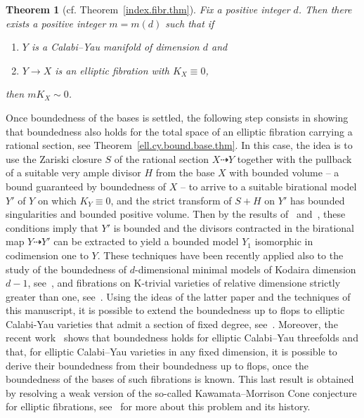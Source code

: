 \documentclass[11pt]{ip-journal}
\newtheorem{theorem}{Theorem}[section]
\theoremstyle{definition}
\begin{document}
\begin{theorem}[cf. Theorem~\ref{index.fibr.thm}]
Fix a positive integer $d$.
Then there exists a positive integer $m = m(d)$ such that if
\begin{enumerate}
    \item $Y$ is a Calabi--Yau manifold of dimension $d$ and
    \item $Y \to X$ is an elliptic fibration with $K_X \equiv 0$,
\end{enumerate}
then $m K_X \sim 0$.
\end{theorem}

Once boundedness of the bases is settled, the following step consists in showing that boundedness also holds for the total space of an elliptic fibration carrying a rational section, see 
Theorem~\ref{ell.cy.bound.base.thm}.
In this case, the idea is to use the Zariski closure $S$ of the rational section $X \dashrightarrow Y$ together with the pullback of a suitable very ample divisor $H$ from the base $X$ with bounded volume -- a bound guaranteed by boundedness of $X$ -- to arrive to a suitable birational model $Y'$ of $Y$ on which $K_Y \equiv 0$, and the strict transform of $S+H$ on $Y'$ has bounded singularities and bounded positive volume.
Then by the results of~\cite{MR3224718} and~\cite{1811.10709}, these conditions imply that 
$Y'$ 
is bounded and the divisors contracted in the birational map 
$Y \dashrightarrow Y'$ 
can be extracted to yield a bounded model 
$Y_1$ 
isomorphic in codimension one to 
$Y$.
These techniques have been recently applied also to the study of the boundedness of 
$d$-dimensional 
minimal models of Kodaira dimension 
$d-1$, 
see~\cites{2005.04254, 2005.05508}, and fibrations on K-trivial varieties of relative dimensione strictly greater than one, see~\cites{2202.07238, 2204.10456}.
Using the ideas of the latter paper and the techniques of this manuscript, it is possible to extend the boundedness up to flops to elliptic Calabi-Yau varieties that admit a section of fixed degree, see~\cite{2005.05508}.
Moreover, the recent work~\cite{2112.01352} shows that boundedness holds for elliptic Calabi--Yau threefolds and that, for elliptic Calabi--Yau varieties in any fixed dimension, it is possible to derive their boundedness from their boundedness up to flops, once the boundedness of the bases of such fibrations is known.
This last result is obtained by resolving a weak version of the so-called Kawamata--Morrison Cone conjecture for elliptic fibrations, see~\cite{2112.01352} for more about this problem and its history.
\end{document}
